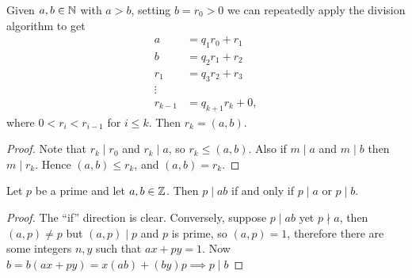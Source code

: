 \documentclass[a4paper, 10pt, twocolumn]{amsart}
\begin{document}


\begin{theorem}
Given $a, b\in \mathbb{N}$ with $a > b$, setting $b = r_0>0$ we can repeatedly apply the division algorithm to get
\begin{align*}
  a &= q_1 r_0 + r_1 \\
  b &= q_2 r_1 + r_2 \\
  r_1 &= q_3 r_2 + r_3 \\
  \vdots \\
  r_{k-1} &= q_{k+1} r_{k} + 0,
\end{align*}
where $0 < r_i < r_{i - 1}$ for $i \leq k$.
Then $r_k = (a, b)$.
\end{theorem}
\begin{proof}
  Note that $r_k \mid r_0$ and $r_k \mid a$, so $r_k \leq (a, b)$. Also if $m \mid a$ and $m \mid b$ then $m\mid r_k$. Hence $(a, b) \leq r_k$, and $(a, b) = r_k$.
\end{proof}

\begin{lemma}
  Let $p$ be a prime and let $a, b\in \mathbb{Z}$. Then $p \mid ab$ if and only if $p \mid a$ or $p \mid b$.
\end{lemma}
\begin{proof}
  The ``if'' direction is clear. Conversely, suppose $p \mid a b$ yet $p \nmid a$, then $(a, p) \neq p$ but $(a, p) \mid p$ and $p$ is prime, so $(a, p)=1$, therefore there are some integers $n, y$ such that $a x+p y=1$. Now $b=b(a x+p y)=x(a b)+(b y) p \implies p \mid b$
\end{proof}
\end{document}
